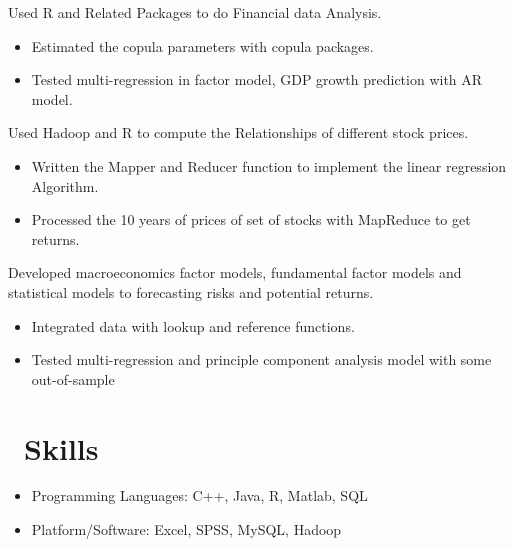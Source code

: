 \documentclass{resume}
\begin{document}
Used R and Related Packages to do Financial data Analysis.
\begin{itemize}
  \item Estimated the copula parameters with copula packages.
  \item Tested multi-regression in factor model, GDP growth prediction with AR model.
\end{itemize}

Used Hadoop and R to compute the Relationships of different stock prices.
\begin{itemize}
  \item Written the Mapper and Reducer function to implement the linear regression Algorithm.
  \item Processed the 10 years of prices of set of stocks with MapReduce to get returns.
\end{itemize}

Developed macroeconomics factor models, fundamental factor models and statistical models to forecasting risks and potential returns.
\begin{itemize}
  \item Integrated data with lookup and reference functions.
  \item Tested multi-regression and principle component analysis model with some out-of-sample
\end{itemize}

\section{\faCog\ Skills}
\begin{itemize}[parsep=0.5ex]
  \item Programming Languages: C++, Java, R, Matlab, SQL 
  \item Platform/Software: Excel, SPSS, MySQL, Hadoop
\end{itemize}

\end{document}

